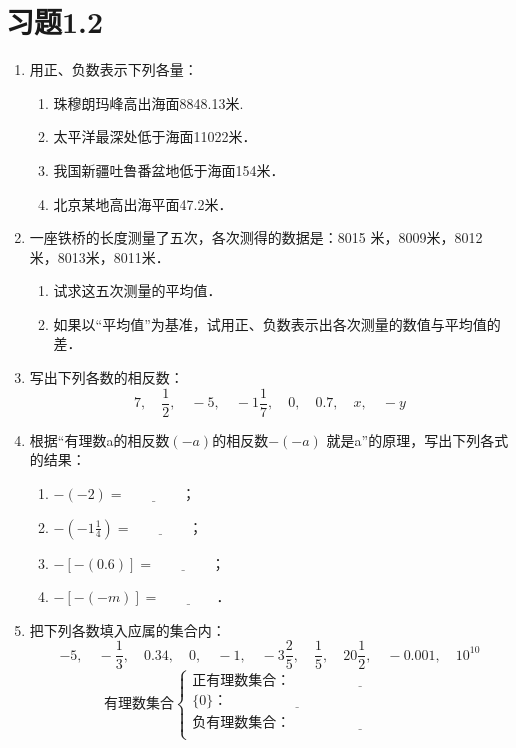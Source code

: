 \section*{习题1.2}
\begin{enumerate}
	\item 用正、负数表示下列各量：
	\begin{enumerate}
		\item 珠穆朗玛峰高出海面8848.13米.
		\item 太平洋最深处低于海面11022米．
		\item 我国新疆吐鲁番盆地低于海面154米．
		\item 北京某地高出海平面47.2米．
	\end{enumerate}
	\item 一座铁桥的长度测量了五次，各次测得的数据是：8015
	米，8009米，8012米，8013米，8011米．
	\begin{enumerate}
		\item 试求这五次测量的平均值．
		\item 如果以“平均值”为基准，试用正、负数表示出各次测量的数值与平均值的差．
	\end{enumerate}
	\item 写出下列各数的相反数：
	\[7,\quad \frac{1}{2},\quad -5,\quad -1\frac{1}{7},\quad 0,\quad 0.7,\quad x,\quad -y  \]
	\item 根据“有理数a的相反数$(- a)$的相反数$-(-a)$
	就是a”的原理，写出下列各式的结果：
	\begin{enumerate}
		\item $-(-2)=\underline{\qquad\qquad}$；
		\item $-\left(-1\frac{1}{4}\right)=\underline{\qquad\qquad}$；
		\item $-[-(0.6)]=\underline{\qquad\qquad}$；
		\item $-[-(-m)]=\underline{\qquad\qquad}$．
	\end{enumerate}
	\item 把下列各数填入应属的集合内：
	\[-5,\quad -\frac{1}{3},\quad 0.34,\quad 0,\quad -1,\quad -3\frac{2}{5},\quad \frac{1}{5},\quad 20\frac{1}{2},\quad -0.001,\quad 10^{10} \]
	\[\text{有理数集合}\begin{cases}
	\text{正有理数集合：}\underline{\qquad\qquad\qquad\qquad\qquad}\\
	\{0\}： \underline{\qquad\qquad\qquad\qquad\qquad}\\    
	\text{负有理数集合：}\underline{\qquad\qquad\qquad\qquad\qquad}\\
	\end{cases}\]
	

\end{enumerate}
